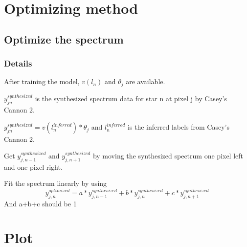 \documentclass{beamer}
\begin{document}

\section{Optimizing method} %

\subsection{Optimize the spectrum} %

\begin{frame}
\frametitle{Details}

After training the model, \(v(l_n)\) and \(\theta_{j}\) are available.


\(y_{jn}^{synthesized}\) is the synthesized spectrum data for star n at pixel j by Casey's 
Cannon 2.



\(y_{jn}^{synthesized}=v(l_n^{inferred})*\theta_{j}\) and \(l_n^{inferred}\) is the 
inferred labels from Casey's Cannon 2.

 
 
Get \(y_{j,n-1}^{synthesized}\) and \(y_{j,n+1}^{synthesized}\) by moving the synthesized spectrum one pixel left and one pixel right.



Fit the spectrum linearly by using 
\[y_{j,n}^{optimized} = a*y_{j,n-1}^{synthesized} + b*y_{j,n}^{synthesized}+c*y_{j,n+1}^{synthesized}\]
And a+b+c should be 1



\end{frame}

\section{Plot} %
\end{document}
